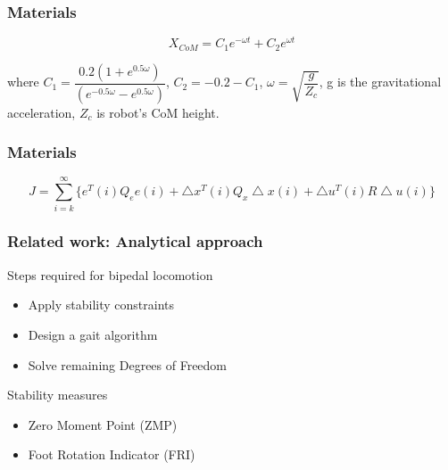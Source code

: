 \documentclass{beamer}
\begin{document}
	\begin{frame}
		\frametitle{Materials} 
		
		\begin{equation}
		X_{CoM} = C_1 e^{-\omega t} + C_2 e^{\omega t}
		\end{equation}
		
		where $C_1 = \dfrac{0.2(1+e^{0.5\omega })}{(e^{-0.5\omega }-e^{0.5\omega })}$, $C_2=-0.2-C_1$, $\omega = \sqrt{\dfrac{g}{Z_c}}$, g is the gravitational acceleration, $Z_c$ is robot's CoM height.
	\end{frame}
	
	
	\begin{frame}
		\frametitle{Materials} 
		
		\begin{equation}
			J = \sum^\infty_{i = k} \{e^T(i) Q_e e(i) + \bigtriangleup x^T(i) Q_x \bigtriangleup x(i) + \bigtriangleup u^T(i) R \bigtriangleup u(i) \}
		\end{equation}
	\end{frame}

	
	\begin{frame}
		\frametitle{Related work: Analytical approach}
		\begin{block}{Steps required for bipedal locomotion}
			\begin{itemize}
				\item
				Apply stability constraints
				\item
				Design a gait algorithm
				\item
				Solve remaining Degrees of Freedom
			\end{itemize}
		\end{block}
		\begin{block}{Stability measures}
			\begin{itemize}
				\item
				Zero Moment Point (ZMP)
				\item
				Foot Rotation Indicator (FRI)
			\end{itemize}
		\end{block}
	\end{frame}
	
	
\end{document}
